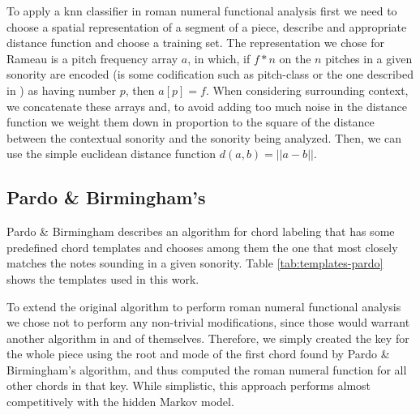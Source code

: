 To apply a knn classifier in roman numeral functional analysis first
we need to choose a spatial representation of a segment of a piece,
describe and appropriate distance function and choose a training
set. The representation we chose for Rameau is a pitch frequency array
$a$, in which, if $f*n$ on the $n$ pitches in a given sonority are
encoded (is some codification such as pitch-class or the one described
in \cite{kroger08:rameau}) as having number $p$, then $a[p] = f$. When
considering surrounding context, we concatenate these arrays and, to
avoid adding too much noise in the distance function we weight them
down in proportion to the square of the distance between the
contextual sonority and the sonority being analyzed. Then, we can use
the simple euclidean distance function $d(a,b) = ||a-b||$.

\subsection{Pardo \& Birmingham's}
\label{sec:pardo--birminghams}

Pardo \& Birmingham \cite{pardo.ea99:automated} describes an algorithm
for chord labeling that has some predefined chord templates and
chooses among them the one that most closely matches the notes
sounding in a given sonority. Table \ref{tab:templates-pardo} shows
the templates used in this work.

To extend the original algorithm to perform roman numeral functional
analysis we chose not to perform any non-trivial modifications, since
those would warrant another algorithm in and of themselves. Therefore,
we simply created the key for the whole piece using the root and mode
of the first chord found by Pardo \& Birmingham's algorithm, and
thus computed the roman numeral function for all other chords in that
key. While simplistic, this approach performs almost competitively
with the hidden Markov model.

